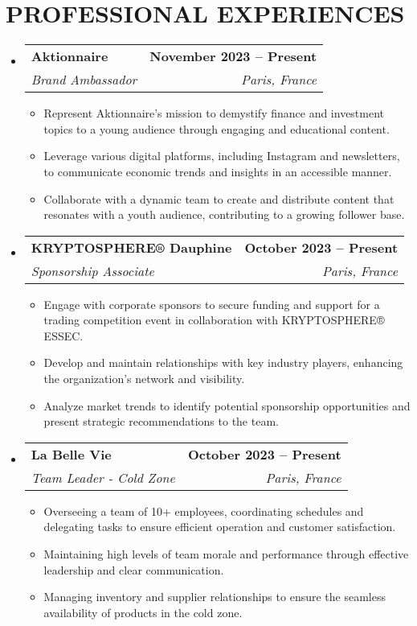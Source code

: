 \documentclass[letterpaper,11pt]{article}
\makeatletter
\newcommand{\resumeItem}[1]{
  \item\small{
    {#1 \vspace{-2pt}}
  }
}
\newcommand{\resumeSubheading}[4]{
  \vspace{-2pt}\item
    \begin{tabular*}{1.0\textwidth}[t]{l@{\extracolsep{\fill}}r}
      \textbf{#1} & \textbf{\small #2} \\
      \textit{\small#3} & \textit{\small #4} \\
    \end{tabular*}\vspace{-7pt}
}
\newcommand{\resumeSubHeadingListStart}{\begin{itemize}[leftmargin=0.0in, label={}]}
\newcommand{\resumeSubHeadingListEnd}{\end{itemize}}
\newcommand{\resumeItemListStart}{\begin{itemize}}
\newcommand{\resumeItemListEnd}{\end{itemize}\vspace{-5pt}}
\makeatother
\begin{document}
\section{PROFESSIONAL EXPERIENCES}
  \resumeSubHeadingListStart

    \resumeSubheading
  {Aktionnaire}{November 2023 -- Present}
  {Brand Ambassador}{Paris, France}
  \resumeItemListStart
    \resumeItem{Represent Aktionnaire’s mission to demystify finance and investment topics to a young audience through engaging and educational content.}
    \resumeItem{Leverage various digital platforms, including Instagram and newsletters, to communicate economic trends and insights in an accessible manner.}
    \resumeItem{Collaborate with a dynamic team to create and distribute content that resonates with a youth audience, contributing to a growing follower base.}
  \resumeItemListEnd
    \resumeSubheading
      {KRYPTOSPHERE® Dauphine}{October 2023 -- Present}
      {Sponsorship Associate}{Paris, France}
      \resumeItemListStart
        \resumeItem{Engage with corporate sponsors to secure funding and support for a trading competition event in collaboration with KRYPTOSPHERE® ESSEC.}
        \resumeItem{Develop and maintain relationships with key industry players, enhancing the organization's network and visibility.}
        \resumeItem{Analyze market trends to identify potential sponsorship opportunities and present strategic recommendations to the team.}
      \resumeItemListEnd

    \resumeSubheading
  {La Belle Vie}{October 2023 -- Present}
  {Team Leader - Cold Zone}{Paris, France}
  \resumeItemListStart
    \resumeItem{Overseeing a team of 10+ employees, coordinating schedules and delegating tasks to ensure efficient operation and customer satisfaction.}
    \resumeItem{Maintaining high levels of team morale and performance through effective leadership and clear communication.}
    \resumeItem{Managing inventory and supplier relationships to ensure the seamless availability of products in the cold zone.}
  \resumeItemListEnd


    
      
    

  \resumeSubHeadingListEnd

\end{document}
